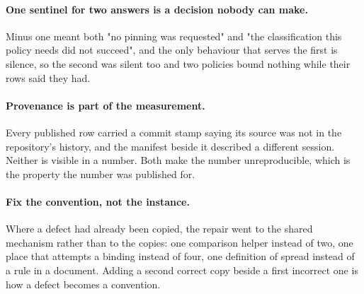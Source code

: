 \documentclass[11pt,a4paper]{report}
\begin{document}
\paragraph{One sentinel for two answers is a decision nobody can make.} Minus one
meant both "no pinning was requested" and "the classification this policy needs
did not succeed", and the only behaviour that serves the first is silence, so the
second was silent too and two policies bound nothing while their rows said they
had.

\paragraph{Provenance is part of the measurement.} Every published row carried a
commit stamp saying its source was not in the repository's history, and the
manifest beside it described a different session. Neither is visible in a number.
Both make the number unreproducible, which is the property the number was
published for.

\paragraph{Fix the convention, not the instance.} Where a defect had already been
copied, the repair went to the shared mechanism rather than to the copies: one
comparison helper instead of two, one place that attempts a binding instead of
four, one definition of spread instead of a rule in a document. Adding a second
correct copy beside a first incorrect one is how a defect becomes a convention.
\end{document}
